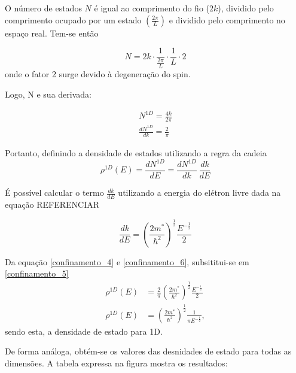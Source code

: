 \par O número de estados $N$ é igual ao comprimento do fio ($2k$), dividido pelo comprimento ocupado por um estado $\left(\frac{2\pi}{L}\right)$ e dividido pelo comprimento no espaço real. Tem-se\cite{confinamento3} então

\begin{equation}
	\label{confinamento_3}
	N = 2k \cdot \frac{1}{\frac{2\pi}{L}} \cdot \frac{1}{L} \cdot 2
\end{equation}
onde o fator 2 surge devido à degeneração do spin.

\par Logo, N e sua derivada:

\begin{align}
	\label{confinamento_4}
	N^{1D} = \frac{4k}{2\pi}\\
	\frac{dN^{1D}}{dk} = \frac{2}{\pi}		
\end{align}

\par Portanto, definindo a densidade de estados utilizando a regra da cadeia
\begin{equation}
	\label{confinamento_5}
	\rho^{1D}(E) = \frac{dN^{1D}}{dE} = \frac{dN^{1D}}{dk}\ \frac{dk}{dE}
\end{equation}

\par É possível calcular o termo $\frac{dk}{dE}$ utilizando a energia do elétron livre dada na equação REFERENCIAR

\begin{equation}
	\label{confinamento_6}
	 \frac{dk}{dE} = \left(\frac{2m^{\ast}}{\hbar^2}\right)^{\frac{1}{2}} \frac{E^{-\frac{1}{2}}}{2}
\end{equation}

\par Da equação \eqref{confinamento_4} e \eqref{confinamento_6}, subsititui-se em \eqref{confinamento_5}
\begin{align}
	\label{confinamento_7}
	\rho^{1D}(E) &= \frac{2}{\pi} \left(\frac{2m^{\ast}}{\hbar^2}\right)^{\frac{1}{2}} \frac{E^{-\frac{1}{2}}}{2}\\
	\rho^{1D}(E) &= \left(\frac{2m^{\ast}}{\hbar^2}\right)^{\frac{1}{2}} \frac{1}{\pi E^{-\frac{1}{2}}},
\end{align}
sendo esta, a densidade de estado para 1D.

\par De forma análoga, obtém-se os valores das desnidades de estado para todas as dimensões. A tabela expressa na figura mostra os resultados:

